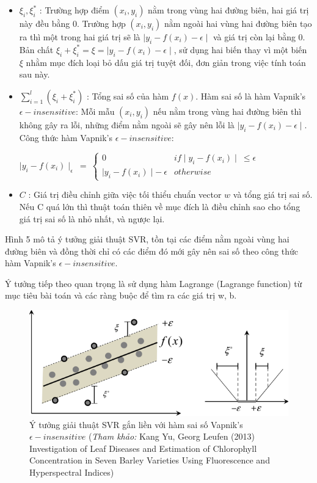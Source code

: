 \documentclass[12pt]{extarticle}
\begin{document}
				\begin{itemize}
					\item $\xi_{i}, \xi_i^*$ : Trường hợp điểm $(x_{i},y_{i})$ nằm trong vùng hai đường biên, hai giá trị này đều bằng 0. Trường hợp $(x_{i},y_{i})$ nằm ngoài hai vùng hai đường biên tạo ra thì một trong hai giá trị sẽ là $\mid y_{i} - f(x_{i})-\epsilon\mid$ và giá trị còn lại bằng 0. Bản chất  $\xi_{i} + \xi_i^ * = \xi= \mid y_{i} - f(x_{i})-\epsilon\mid$, sử dụng hai biến thay vì một biến $\xi$ nhằm mục đích loại bỏ dấu giá trị tuyệt đối, đơn giản trong việc tính toán sau này.
					\item $\sum_{i=1}^l(\xi_{i}+\xi_i^*)$ : Tổng sai số của hàm $f(x)$. Hàm sai số là hàm Vapnik's $\epsilon - insensitive$: Mỗi mẫu $(x_{i},y_{i})$ nếu nằm trong vùng hai đường biên thì không gây ra lỗi, những điểm nằm ngoài sẽ gây nên lỗi là $\mid y_{i} - f(x_{i})-\epsilon\mid$. Công thức hàm Vapnik's $\epsilon - insensitive$:
					\begin{center}
						$\mid y_{i} - f(x_{i})\mid_{\epsilon} \:=\:\begin{cases}0 &  if \mid y_{i} - f(x_{i})\mid \:\leq \epsilon\\\mid y_{i} - f(x_{i})\mid - \: \epsilon & otherwise\end{cases} $ 
					\end{center}
					\item $C$ : Giá trị điều chỉnh giữa việc tối thiểu chuẩn vector $w$ và tổng giá trị sai số. Nếu C quá lớn thì thuật toán thiên về mục đích là điều chỉnh sao cho tổng giá trị sai số là nhỏ nhất, và ngược lại.
				\end{itemize}
			\par Hình 5 mô tả ý tưởng giải thuật SVR, tồn tại các điểm nằm ngoài vùng hai đường biên và đồng thời  chỉ có các điểm đó mới gây nên sai số theo công thức hàm  Vapnik's $\epsilon - insensitive$.
			\par Ý tưởng tiếp theo quan trọng là sử dụng hàm Lagrange (Lagrange function) từ mục tiêu bài toán và các ràng buộc để tìm ra các giá trị w, b.
				\begin{figure}[h!]
				\includegraphics[width=\linewidth]{svr}
				\caption[Minh họa cách tính sai số trong mô hình SVR]{Ý tưởng giải thuật SVR gắn liền với hàm sai số Vapnik's $\epsilon - insensitive$  
					(\textit{Tham khảo:} Kang Yu, Georg Leufen (2013) Investigation of Leaf Diseases and Estimation of Chlorophyll Concentration in Seven Barley Varieties Using Fluorescence and Hyperspectral Indices)}
				\label{fig:svr}
			\end{figure}
				
\end{document}

